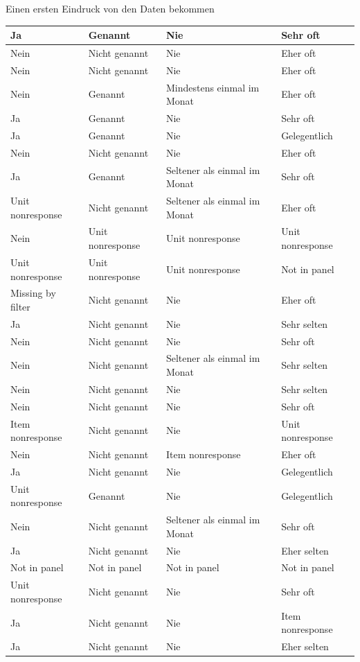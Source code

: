 \documentclass[ignorenonframetext,]{beamer}
\begin{document}
\begin{frame}{Einen ersten Eindruck von den Daten bekommen}
\begin{tabular}{l|l|l|l}
\hline
Ja & Genannt & Nie & Sehr oft\\
\hline
Nein & Nicht genannt & Nie & Eher oft\\
\hline
Nein & Nicht genannt & Nie & Eher oft\\
\hline
Nein & Genannt & Mindestens einmal im Monat & Eher oft\\
\hline
Ja & Genannt & Nie & Sehr oft\\
\hline
Ja & Genannt & Nie & Gelegentlich\\
\hline
Nein & Nicht genannt & Nie & Eher oft\\
\hline
Ja & Genannt & Seltener als einmal im Monat & Sehr oft\\
\hline
Unit nonresponse & Nicht genannt & Seltener als einmal im Monat & Eher oft\\
\hline
Nein & Unit nonresponse & Unit nonresponse & Unit nonresponse\\
\hline
Unit nonresponse & Unit nonresponse & Unit nonresponse & Not in panel\\
\hline
Missing by filter & Nicht genannt & Nie & Eher oft\\
\hline
Ja & Nicht genannt & Nie & Sehr selten\\
\hline
Nein & Nicht genannt & Nie & Sehr oft\\
\hline
Nein & Nicht genannt & Seltener als einmal im Monat & Sehr selten\\
\hline
Nein & Nicht genannt & Nie & Sehr selten\\
\hline
Nein & Nicht genannt & Nie & Sehr oft\\
\hline
Item nonresponse & Nicht genannt & Nie & Unit nonresponse\\
\hline
Nein & Nicht genannt & Item nonresponse & Eher oft\\
\hline
Ja & Nicht genannt & Nie & Gelegentlich\\
\hline
Unit nonresponse & Genannt & Nie & Gelegentlich\\
\hline
Nein & Nicht genannt & Seltener als einmal im Monat & Sehr oft\\
\hline
Ja & Nicht genannt & Nie & Eher selten\\
\hline
Not in panel & Not in panel & Not in panel & Not in panel\\
\hline
Unit nonresponse & Nicht genannt & Nie & Sehr oft\\
\hline
Ja & Nicht genannt & Nie & Item nonresponse\\
\hline
Ja & Nicht genannt & Nie & Eher selten\\

\end{tabular}
\end{frame}
\end{document}
